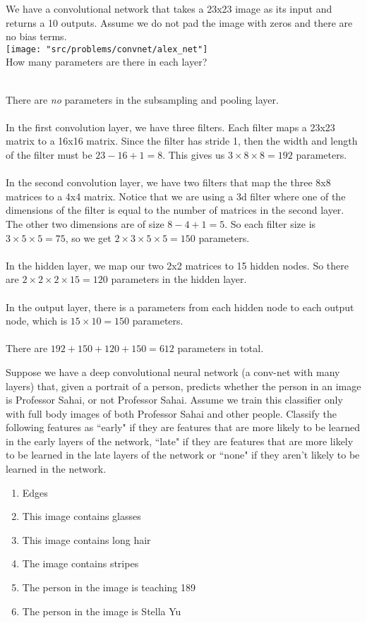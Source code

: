 \begin{Parts}
\Part
We have a convolutional network that takes a 23x23 image as its input and returns a 10 outputs. Assume we do not pad the image with zeros and there are no bias terms. \\
\texttt{[image: "src/problems/convnet/alex\_net"]}
\\
How many parameters are there in each layer? \\
\\
\begin{solution}
There are \emph{no} parameters in the subsampling and pooling layer. \\
\\
In the first convolution layer, we have three filters. Each filter maps a 23x23 matrix to a 16x16 matrix. Since the filter has stride 1, then the width and length of the filter must be $23-16+1 = 8$. This gives us $3 \times 8 \times 8 = 192$ parameters. \\
\\
In the second convolution layer, we have two filters that map the three 8x8 matrices to a 4x4 matrix. Notice that we are using a 3d filter where one of the dimensions of the filter is equal to the number of matrices in the second layer. The other two dimensions are of size $8-4+1 = 5$. So each filter size is $3 \times 5 \times 5 = 75$, so we get $2 \times 3 \times 5 \times 5 = 150$ parameters. \\
\\
In the hidden layer, we map our two 2x2 matrices to 15 hidden nodes. So there are $2 \times 2 \times 2 \times 15 = 120$ parameters in the hidden layer. \\
\\
In the output layer, there is a parameters from each hidden node to each output node, which is $15 \times 10 = 150$ parameters. \\
\\
There are $192 + 150 + 120 + 150 = 612$ parameters in total. \\
\end{solution}

\Part

Suppose we have a deep convolutional neural network (a conv-net with many layers) that, given a portrait of a person, predicts whether the person in an image is Professor Sahai, or not Professor Sahai. Assume we train this classifier only with full body images of both Professor Sahai and other people. Classify the following features as ``early" if they are features that are more likely to be learned in the early layers of the network, ``late" if they are features that are more likely to be learned in the late layers of the network or ``none" if they aren't likely to be learned in the network.
\begin{enumerate}
\item Edges
\item This image contains glasses
\item This image contains long hair
\item The image contains stripes
\item The person in the image is teaching 189
\item The person in the image is Stella Yu


\end{enumerate}
\end{Parts}
